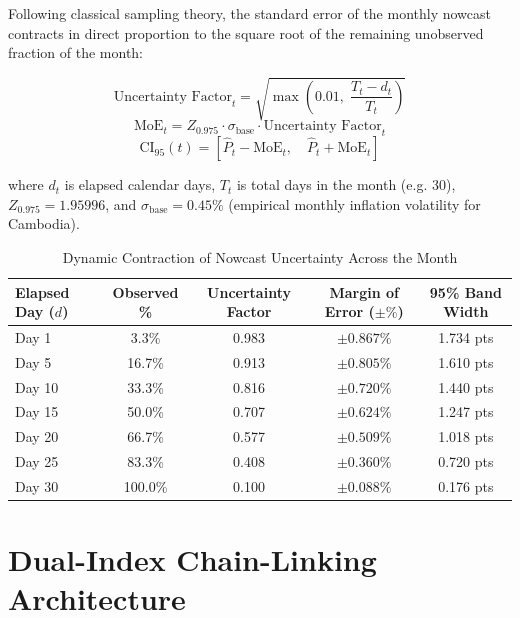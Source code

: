 \documentclass[11pt,a4paper]{article}
\begin{document}
Following classical sampling theory, the standard error of the monthly nowcast contracts in direct proportion to the square root of the remaining unobserved fraction of the month:

\begin{formulabox}
\begin{equation}
    \text{Uncertainty Factor}_t = \sqrt{ \max\left( 0.01, \; \frac{T_t - d_t}{T_t} \right) }
\end{equation}
\begin{equation}
    \text{MoE}_t = Z_{0.975} \cdot \sigma_{\text{base}} \cdot \text{Uncertainty Factor}_t
\end{equation}
\begin{equation}
    \text{CI}_{95}(t) = \left[ \hat{P}_t - \text{MoE}_t, \quad \hat{P}_t + \text{MoE}_t \right]
\end{equation}
\end{formulabox}

where $d_t$ is elapsed calendar days, $T_t$ is total days in the month (e.g. 30), $Z_{0.975} = 1.95996$, and $\sigma_{\text{base}} = 0.45\%$ (empirical monthly inflation volatility for Cambodia).

\begin{table}[htbp]
\centering
\small
\caption{Dynamic Contraction of Nowcast Uncertainty Across the Month}
\vspace{4pt}
\begin{tabularx}{0.9\textwidth}{lcccc}
\toprule
\textbf{Elapsed Day ($d$)} & \textbf{Observed \%} & \textbf{Uncertainty Factor} & \textbf{Margin of Error ($\pm\%$)} & \textbf{95\% Band Width} \\
\midrule
Day 1  & 3.3\%   & 0.983 & $\pm 0.867\%$ & 1.734 pts \\
Day 5  & 16.7\%  & 0.913 & $\pm 0.805\%$ & 1.610 pts \\
Day 10 & 33.3\%  & 0.816 & $\pm 0.720\%$ & 1.440 pts \\
Day 15 & 50.0\%  & 0.707 & $\pm 0.624\%$ & 1.247 pts \\
Day 20 & 66.7\%  & 0.577 & $\pm 0.509\%$ & 1.018 pts \\
Day 25 & 83.3\%  & 0.408 & $\pm 0.360\%$ & 0.720 pts \\
Day 30 & 100.0\% & 0.100 & $\pm 0.088\%$ & 0.176 pts \\
\bottomrule
\end{tabularx}
\end{table}

\section{Dual-Index Chain-Linking Architecture}
\end{document}
